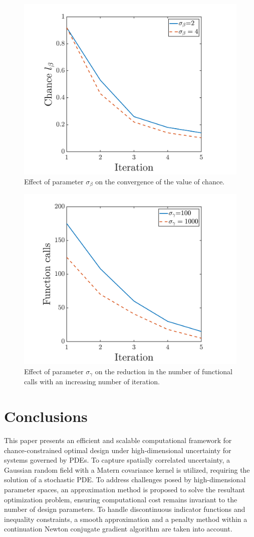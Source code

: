\documentclass[pdf-a,balance,colorlinks,upint,subscriptcorrection,varvw,mathalfa=cal=boondoxo, spanish,french,vietnamese,russian,greek]{asmeconf}
\begin{document}
\begin{figure}[h]
\centering
\includegraphics[width=0.8\linewidth]{Figures/Beta_1.png}
\caption{Effect of parameter $\sigma_{\beta}$ on the convergence of the value of chance.}\label{fig:beta}
\end{figure}
\begin{figure}[h]
\centering
\includegraphics[width=0.8\linewidth]{Figures/Gam_1.png}
\caption{Effect of parameter $\sigma_{\gamma}$ on the reduction
in the number of functional calls with an increasing number of
iteration.}\label{fig:gamma}
\end{figure}

\section{Conclusions}
\noindent
This paper presents an efficient and scalable computational framework for chance-constrained optimal design under high-dimensional uncertainty for systems governed by PDEs. To capture spatially correlated uncertainty, a Gaussian random field with a Matern covariance kernel is utilized, requiring the solution of a stochastic PDE.
To address challenges posed by high-dimensional parameter spaces, an approximation method is proposed to solve the resultant optimization problem, ensuring computational cost remains invariant to the number of design parameters. To handle discontinuous indicator functions and inequality constraints, a smooth approximation and a penalty method within a continuation Newton conjugate gradient algorithm are taken into account.
\end{document}
